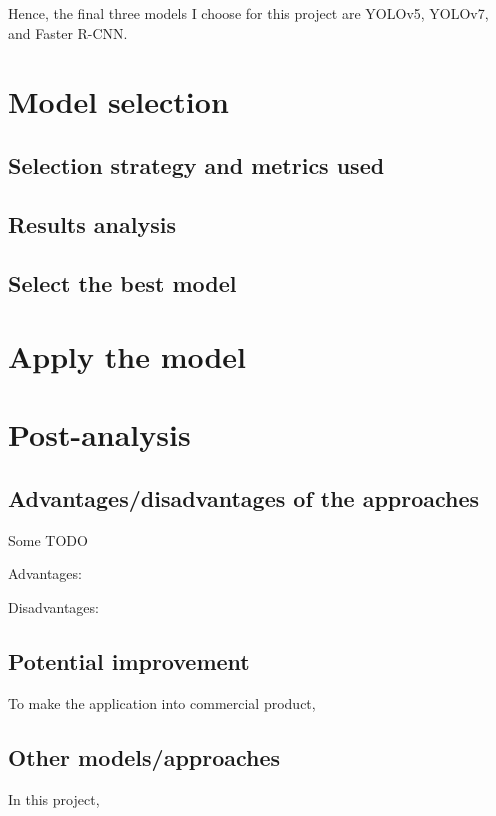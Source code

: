 \documentclass[runningheads]{llncs}
\begin{document}
Hence, the final three models I choose for this project are YOLOv5, YOLOv7, and Faster R-CNN.

\section{Model selection}
\subsection{Selection strategy and metrics used}

\subsection{Results analysis}

\subsection{Select the best model}


\section{Apply the model}


\section{Post-analysis}
\subsection{Advantages/disadvantages of the approaches}
Some TODO

Advantages:

Disadvantages:
\subsection{Potential improvement}
To make the application into commercial product, 

\subsection{Other models/approaches}
In this project, 
\end{document}
